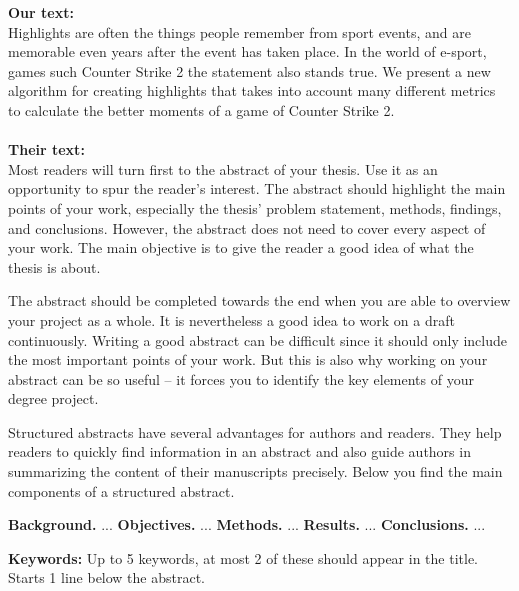 \documentclass[a4paper,twoside]{bth}
\begin{document}
\abstract
\textbf{Our text:}\\
Highlights are often the things people remember from sport events, and are memorable even years after the event has taken place. In the world of e-sport, games such Counter Strike 2 the statement also stands true. We present a new algorithm for creating highlights that takes into account many different metrics to calculate the better moments of a game of Counter Strike 2.
\\\\
\textbf{Their text:}\\
Most readers will turn first to the abstract of your thesis. Use it as an opportunity to spur the reader's interest. The abstract should highlight the main points of your work, especially the thesis' problem statement, methods, findings, and conclusions. However, the abstract does not need to cover every aspect of your work. The main objective is to give the reader a good idea of what the thesis is about.

The abstract should be completed towards the end when you are able to overview your project as a whole. It is nevertheless a good idea to work on a draft continuously. Writing a good abstract can be difficult since it should only include the most important points of your work. But this is also why working on your abstract can be so useful -- it forces you to identify the key elements of your degree project.

Structured abstracts have several advantages for authors and readers. They help readers to quickly find information in an abstract and also guide authors in summarizing the content of their manuscripts precisely. Below you find the main components of a structured abstract.

\noindent
\textbf{Background.} ... \newline
\textbf{Objectives.} ... \newline
\textbf{Methods.} ... \newline
\textbf{Results.} ... \newline
\textbf{Conclusions.} ...

\vspace{1cm}
\noindent
\textbf{Keywords:} Up to 5 keywords, at most 2 of these should appear in the title. Starts 1 line below the abstract.

\cleardoublepage
\end{document}
